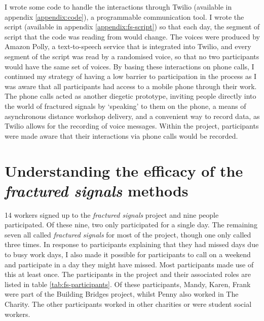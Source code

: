 I wrote some code to handle the interactions through Twilio (available in appendix \ref{appendix:code}), a programmable communication tool. I wrote the script (available in appendix \ref{appendix:fs-script}) so that each day, the segment of script that the code was reading from would change. The voices were produced by Amazon Polly, a text-to-speech service that is integrated into Twilio, and every segment of the script was read by a randomised voice, so that no two participants would have the same set of voices. By basing these interactions on phone calls, I continued my strategy of having a low barrier to participation in the process as I was aware that all participants had access to a mobile phone through their work. The phone calls acted as another diegetic prototype, inviting people directly into the world of fractured signals by `speaking' to them on the phone, a means of asynchronous distance workshop delivery, and a convenient way to record data, as Twilio allows for the recording of voice messages. Within the project, participants were made aware that their interactions via phone calls would be recorded.

\section{Understanding the efficacy of the \textit{fractured signals} methods}
14 workers signed up to the \textit{fractured signals} project and nine people participated. Of these nine, two only participated for a single day. The remaining seven all called \textit{fractured signals} for most of the project, though one only called three times. In response to participants explaining that they had missed days due to busy work days, I also made it possible for participants to call on a weekend and participate in a day they might have missed. Most participants made use of this at least once. The participants in the project and their associated roles are listed in table \ref{tab:fs-participants}. Of these participants, Mandy, Karen, Frank were part of the Building Bridges project, whilst Penny also worked in The Charity. The other participants worked in other charities or were student social workers.

